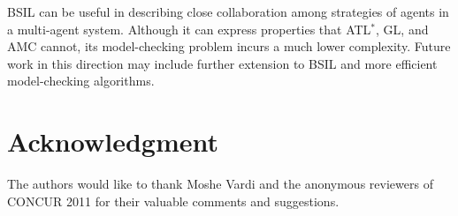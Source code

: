 \documentclass[11pt]{article}
\begin{document}
BSIL can be useful in describing close collaboration among strategies of 
agents in a multi-agent system. 
Although it can express properties that
ATL$^*$, GL, and AMC cannot, its model-checking problem incurs a
much lower complexity.  
Future work in this direction may include
further extension to BSIL and 
more efficient model-checking algorithms.  

\section*{Acknowledgment}
The authors would like to thank Moshe Vardi and the anonymous reviewers of CONCUR 2011 for their valuable comments and suggestions. 




% 

\end{document}
